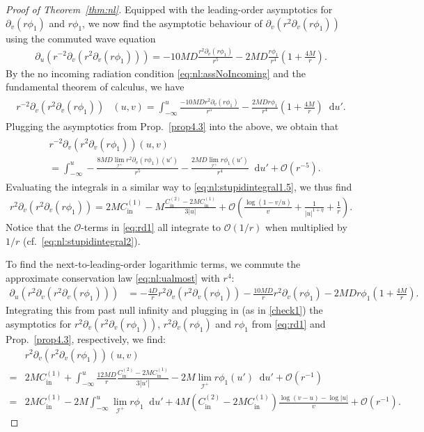 \documentclass[11pt,english]{article}
\numberwithin{equation}{section}
\theoremstyle{remark}
\theoremstyle{plain}
\newenvironment{nalign}{
    \begin{equation}
    \begin{aligned}
}{
    \end{aligned}
    \end{equation}
    \ignorespacesafterend
}
\theoremstyle{remark}
\newcommand{\dd}{\mathop{}\!\mathrm{d}}
\newcommand{\pu}{\partial_u}
\newcommand{\pv}{\partial_v}
\renewcommand{\(}{\left(}
\renewcommand{\)}{\right)}
\newcommand{\cc}{C_{\mathrm{in}}^{(1)}}
\newcommand{\ccc}{C_{\mathrm{in}}^{(2)}}
\newcommand{\pho}{(r\phi_1)}
\begin{document}
\begin{proof}[Proof of Theorem~\ref{thm:nl}]
Equipped with the leading-order asymptotics for $\pv\pho$ and $r\phi_1$, we now find the asymptotic behaviour of $\pv(r^2\pv\pho)$ using the commuted wave equation
\begin{align}\label{eq:nl:ualmost}
\pu(r^{-2}\pv(r^2\pv(r\phi_1)))=-10 MD\frac{r^2\pv(r\phi_1)}{r^5}-2MD\frac{r\phi_1}{r^4}\left(1+\frac{4M}{r}\right).
\end{align}
By the no incoming radiation condition \eqref{eq:nl:assNoIncoming} and the fundamental theorem of calculus, we have
\begin{align}
	\begin{split}
	r^{-2}\pv(r^2\pv\pho)&(u,v)
						=\int_{-\infty}^u \frac{-10MDr^2\pv\pho}{r^5}-\frac{2MDr\phi_1}{r^4}\left(1+\frac{4M}{r}\right) \dd u'.
	\end{split}
\end{align}
Plugging the asymptotics from Prop.~\ref{prop4.3} into the above, we obtain that
\begin{align}\label{check1}
	\begin{split}
	&r^{-2}\pv(r^2\pv\pho)(u,v)\\
	&=\int_{-\infty}^u -\frac{8MD\lim_{\mathcal{I}^+}r^2\pv\pho(u')}{r^5}-\frac{2MD\lim_{\mathcal{I}^+}r\phi_1(u')}{r^4} \dd u'+\mathcal{O}(r^{-5}).
		\end{split}
\end{align}
Evaluating the integrals in a similar way to \eqref{eq:nl:stupidintegral1.5}, we thus find
\begin{align}\label{eq:rd1}
	r^2\pv(r^2\pv\pho)=2M\cc-M\frac{\ccc-2M\cc}{3|u|}+\mathcal{O}\left(\frac{\log (1-v/u)}{v}+\frac{1}{|u|^{1+\eta}}+\frac{1}{r}\right).
\end{align}
Notice that the $\mathcal{O}$-terms in \eqref{eq:rd1} all integrate to $\mathcal{O}(1/r)$ when multiplied by $1/r$ (cf.\ \eqref{eq:nl:stupidintegral2}).

To find the next-to-leading-order logarithmic terms, we commute the approximate conservation law \eqref{eq:nl:ualmost} with $r^4$:
\begin{align*}
\pu(r^2\pv(r^2\pv\pho))&=-\frac{4D}{r} r^2\pv(r^2\pv\pho)
-\frac{10MD}{r}r^2\pv\pho-2MDr\phi_1\left(1+\frac{4M}{r}\right).
\end{align*}
Integrating this from past null infinity and plugging in (as in \eqref{check1}) the asymptotics for $r^2\pv(r^2\pv\pho)$, $r^2\pv\pho$ and $r\phi_1$ from \eqref{eq:rd1} and Prop.~\ref{prop4.3}, respectively,  we find:
\begin{nalign}
	&r^{2}\pv(r^2\pv\pho)(u,v)\\
	=&2M\cc
	+\int_{-\infty}^u	\frac{12MD}{r}\frac{\ccc-2M\cc}{3|u'|} -2M\lim_{\mathcal{I}^+}r\phi_1(u') \dd u'+\mathcal{O}(r^{-1})\\
	=&2M\cc-2M\int_{-\infty}^u\lim_{\mathcal{I}^+}r\phi_1\dd u'+4M(\ccc-2M\cc)\frac{\log (v-u)-\log|u|}{v}+\mathcal{O}(r^{-1}).
\end{nalign}


\end{proof}
\end{document}
